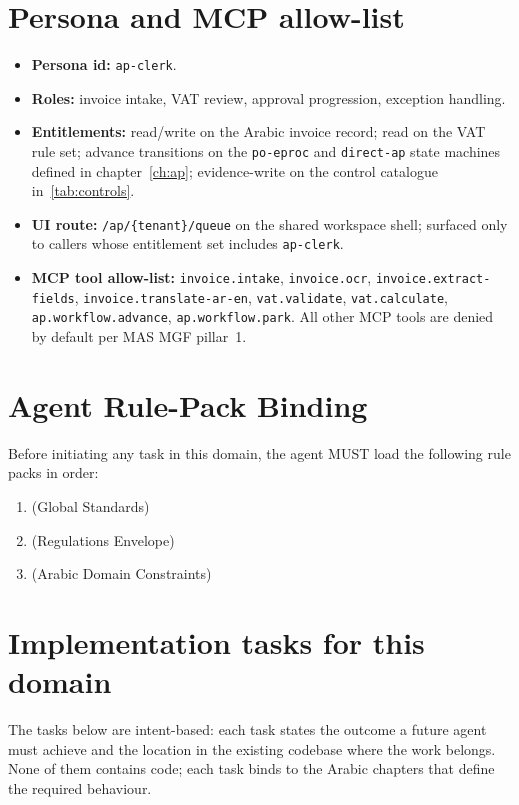 \section{Persona and MCP allow-list}
\label{sec:agent-persona}
\begin{itemize}
  \item \textbf{Persona id:} \texttt{ap-clerk}.
  \item \textbf{Roles:} invoice intake, VAT review, approval
    progression, exception handling.
  \item \textbf{Entitlements:} read/write on the Arabic invoice
    record; read on the VAT rule set; advance transitions on the
    \texttt{po-eproc} and \texttt{direct-ap} state machines defined
    in chapter~\ref{ch:ap}; evidence-write on the control catalogue
    in~\ref{tab:controls}.
  \item \textbf{UI route:} \texttt{/ap/\{tenant\}/queue} on the shared
    workspace shell; surfaced only to callers whose entitlement set
    includes \texttt{ap-clerk}.
  \item \textbf{MCP tool allow-list:}
    \texttt{invoice.intake}, \texttt{invoice.ocr},
    \texttt{invoice.extract-fields},
    \texttt{invoice.translate-ar-en}, \texttt{vat.validate},
    \texttt{vat.calculate}, \texttt{ap.workflow.advance},
    \texttt{ap.workflow.park}. All other MCP tools are denied by
    default per MAS MGF pillar~1.
\end{itemize}

\section{Agent Rule-Pack Binding}
\label{sec:agent-rule-binding}
Before initiating any task in this domain, the agent MUST load the following rule packs in order:
\begin{enumerate}
  \item {} (Global Standards)
  \item {} (Regulations Envelope)
  \item {} (Arabic Domain Constraints)
\end{enumerate}

\section{Implementation tasks for this domain}
\label{sec:agent-tasks}
The tasks below are intent-based: each task states the outcome a
future agent must achieve and the location in the existing codebase
where the work belongs. None of them contains code; each task binds
to the Arabic chapters that define the required behaviour.

